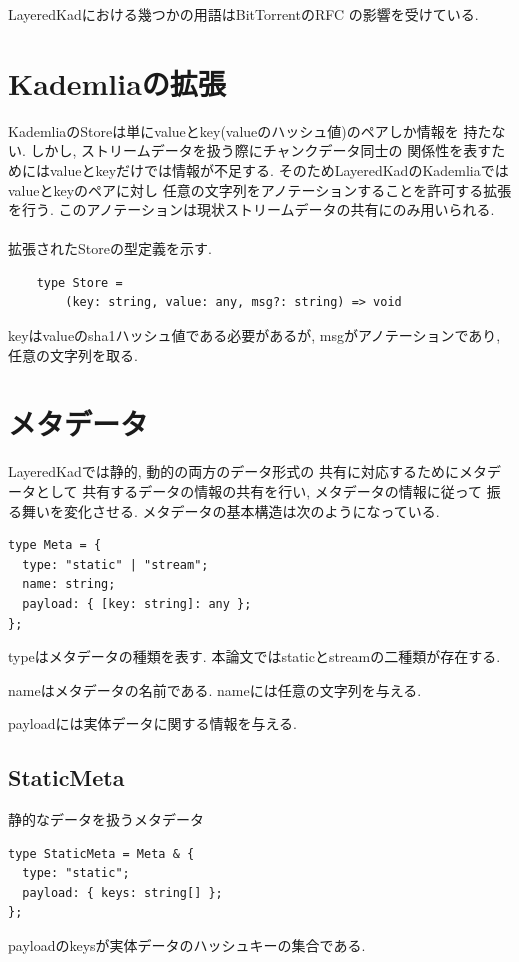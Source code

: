 \documentclass[sotsuron]{jcsie}
\begin{document}
LayeredKadにおける幾つかの用語はBitTorrentのRFC\cite{bep0000r38:online}
の影響を受けている.

\section{Kademliaの拡張}
KademliaのStoreは単にvalueとkey(valueのハッシュ値)のペアしか情報を
持たない.
しかし, ストリームデータを扱う際にチャンクデータ同士の
関係性を表すためにはvalueとkeyだけでは情報が不足する.
そのためLayeredKadのKademliaではvalueとkeyのペアに対し
任意の文字列をアノテーションすることを許可する拡張を行う.
このアノテーションは現状ストリームデータの共有にのみ用いられる.
\\\\
拡張されたStoreの型定義を示す.
\begin{lstlisting}
	type Store = 
		(key: string, value: any, msg?: string) => void
\end{lstlisting}
keyはvalueのsha1ハッシュ値である必要があるが, 
msgがアノテーションであり, 任意の文字列を取る.

\newpage

\section{メタデータ}
LayeredKadでは静的, 動的の両方のデータ形式の
共有に対応するためにメタデータとして
共有するデータの情報の共有を行い, メタデータの情報に従って
振る舞いを変化させる.
メタデータの基本構造は次のようになっている.

\begin{lstlisting}
type Meta = {
  type: "static" | "stream";
  name: string;
  payload: { [key: string]: any };
};
\end{lstlisting}

typeはメタデータの種類を表す.
本論文ではstaticとstreamの二種類が存在する.

nameはメタデータの名前である. nameには任意の文字列を与える.

payloadには実体データに関する情報を与える.

\subsection{StaticMeta}
静的なデータを扱うメタデータ
\begin{lstlisting}
type StaticMeta = Meta & {
  type: "static";
  payload: { keys: string[] };
};
\end{lstlisting}

payloadのkeysが実体データのハッシュキーの集合である.
\end{document}
